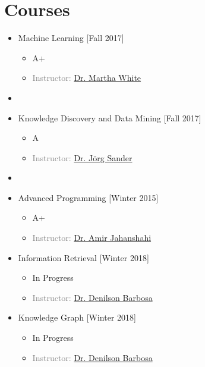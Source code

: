 \section{Courses}
\begin{multicols}{2}
\begin{itemize}
	\item {} Machine Learning \hfill[Fall 2017]
	\begin{itemize}
		\item A+
		\item \textcolor{gray}{Instructor: \href{http://webdocs.cs.ualberta.ca/~whitem/}{Dr. Martha White}}
	\end{itemize}
\item[]


	\item {} Knowledge Discovery and Data Mining \hfill[Fall 2017]
	\begin{itemize}
		\item A 
		\item \textcolor{gray}{Instructor: \href{http://webdocs.cs.ualberta.ca/~joerg/}{Dr. Jörg Sander}}
	\end{itemize}
\item[]
	
	\item {} Advanced Programming \hfill \hfill[Winter 2015]
	\begin{itemize}
		\item A+ 
		\item \textcolor{gray}{Instructor: \href{http://ee.aut.ac.ir/autcms/people/verticalPagesAjax/professorHomePage.htm?url=jahanshahi&depurl=electrical-engineering&lang=en&cid=50451496}{Dr. Amir Jahanshahi}}
		
	\end{itemize}

	\item {} Information Retrieval \hfill[Winter 2018]
	\begin{itemize}
		\item In Progress 
		\item \textcolor{gray}{Instructor: \href{https://sites.ualberta.ca/~denilson/}{Dr. Denilson Barbosa}}
	\end{itemize}

	\item {} Knowledge Graph \hfill[Winter 2018]
	\begin{itemize}
		\item In Progress 
		\item \textcolor{gray}{Instructor: \href{https://sites.ualberta.ca/~denilson/}{Dr. Denilson Barbosa}}
	\end{itemize}


\end{itemize}
\end{multicols}
